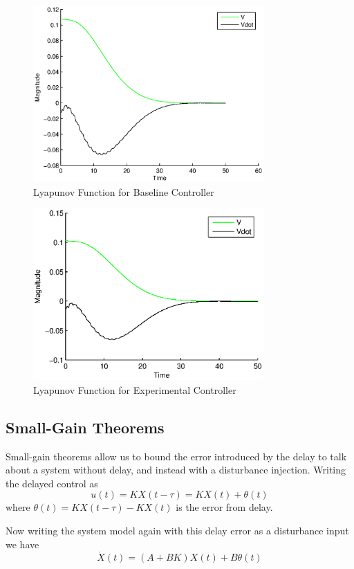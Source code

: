\documentclass[conference]{IEEEtran}
\begin{document}
\begin{figure}[htp]
\centering
\includegraphics[width=250pt]{lyapBase}
\caption{Lyapunov Function for Baseline Controller}\label{fig:lyapBase}
\end{figure}

\begin{figure}[htp]
\centering
\includegraphics[width=250pt]{lyapExp}
\caption{Lyapunov Function for Experimental Controller}\label{fig:lyapExp}
\end{figure}

\subsection{Small-Gain Theorems}

Small-gain theorems allow us to bound the error introduced by the delay to talk about a system without delay, and instead with a disturbance injection.  Writing the delayed control as 
\begin{equation}
u\left(t\right)=KX\left(t-\tau\right)=KX\left(t\right)+\theta\left(t\right)
\end{equation} where $\theta\left(t\right)=KX\left(t-\tau\right)-KX\left(t\right)$ is the error from delay.

Now writing the system model again with this delay error as a disturbance input we have 
\begin{equation}
\dot{X}\left(t\right)=\left(A+BK\right)X\left(t\right)+B\theta\left(t\right)
\end{equation}
\end{document}
